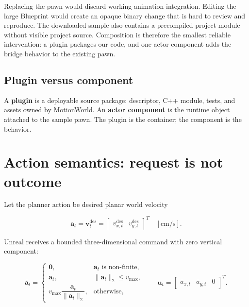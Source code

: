 \documentclass[11pt]{article}
\begin{document}
Replacing the pawn would discard working animation integration. Editing the large Blueprint would
create an opaque binary change that is hard to review and reproduce. The downloaded sample also
contains a precompiled project module without visible project source. Composition is therefore the
smallest reliable intervention: a plugin packages our code, and one actor component adds the bridge
behavior to the existing pawn.

\subsection*{Plugin versus component}

A \textbf{plugin} is a deployable source package: descriptor, C++ module, tests, and assets owned by
MotionWorld. An \textbf{actor component} is the runtime object attached to the sample pawn. The
plugin is the container; the component is the behavior.

\section{Action semantics: request is not outcome}\label{sec:action}

Let the planner action be desired planar world velocity

\begin{equation}
  \mathbf{a}_t = \mathbf{v}^{\mathrm{des}}_t =
  \begin{bmatrix}v^{\mathrm{des}}_{x,t} & v^{\mathrm{des}}_{y,t}\end{bmatrix}^{\!T}
  \quad [\mathrm{cm/s}].
\end{equation}

Unreal receives a bounded three-dimensional command with zero vertical component:

\begin{equation}
  \bar{\mathbf{a}}_t =
  \begin{cases}
  \mathbf{0}, & \mathbf{a}_t \text{ is non-finite},\\[2mm]
  \mathbf{a}_t, & \lVert\mathbf{a}_t\rVert_2 \leq v_{\max},\\[2mm]
  v_{\max}\dfrac{\mathbf{a}_t}{\lVert\mathbf{a}_t\rVert_2}, & \text{otherwise},
  \end{cases}
  \qquad
  \mathbf{u}_t = \begin{bmatrix}\bar a_{x,t}&\bar a_{y,t}&0\end{bmatrix}^{T}.
\end{equation}
\end{document}
